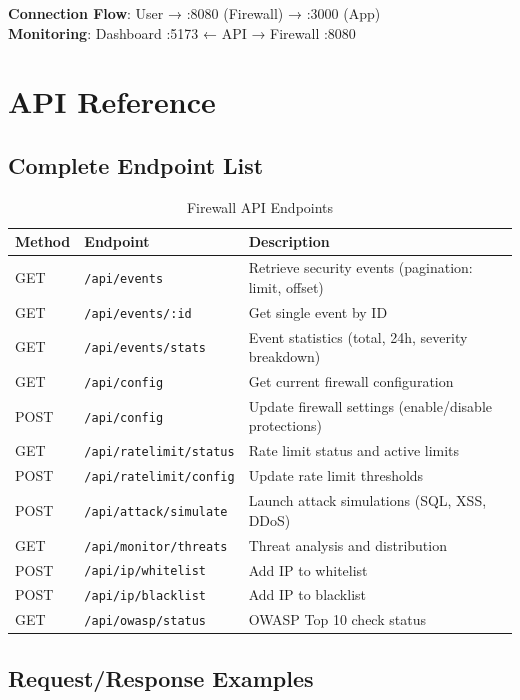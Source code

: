 \documentclass[11pt,a4paper]{report}
\begin{document}
\textbf{Connection Flow}: User → :8080 (Firewall) → :3000 (App) \\
\textbf{Monitoring}: Dashboard :5173 ← API → Firewall :8080

\chapter{API Reference}

\section{Complete Endpoint List}

\begin{table}[H]
\centering
\small
\begin{tabular}{@{}llp{6cm}@{}}
\toprule
\textbf{Method} & \textbf{Endpoint} & \textbf{Description} \\ \midrule
GET & \texttt{/api/events} & Retrieve security events (pagination: limit, offset) \\
GET & \texttt{/api/events/:id} & Get single event by ID \\
GET & \texttt{/api/events/stats} & Event statistics (total, 24h, severity breakdown) \\
GET & \texttt{/api/config} & Get current firewall configuration \\
POST & \texttt{/api/config} & Update firewall settings (enable/disable protections) \\
GET & \texttt{/api/ratelimit/status} & Rate limit status and active limits \\
POST & \texttt{/api/ratelimit/config} & Update rate limit thresholds \\
POST & \texttt{/api/attack/simulate} & Launch attack simulations (SQL, XSS, DDoS) \\
GET & \texttt{/api/monitor/threats} & Threat analysis and distribution \\
POST & \texttt{/api/ip/whitelist} & Add IP to whitelist \\
POST & \texttt{/api/ip/blacklist} & Add IP to blacklist \\
GET & \texttt{/api/owasp/status} & OWASP Top 10 check status \\ \bottomrule
\end{tabular}
\caption{Firewall API Endpoints}
\end{table}

\section{Request/Response Examples}
\end{document}

